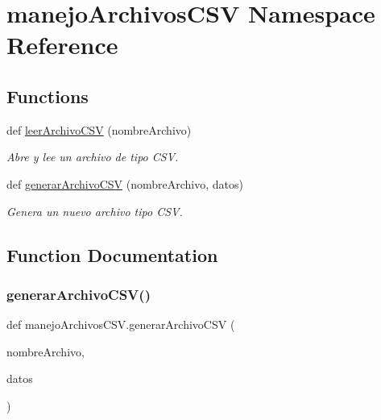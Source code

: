 \hypertarget{namespacemanejo_archivos_c_s_v}{}\section{manejo\+Archivos\+C\+SV Namespace Reference}
\label{namespacemanejo_archivos_c_s_v}
\subsection*{Functions}
\begin{DoxyCompactItemize}
\item 
def \mbox{\hyperlink{namespacemanejo_archivos_c_s_v_af84ef6e5a0591162a0b781c11145845e}{leer\+Archivo\+C\+SV}} (nombre\+Archivo)
\begin{DoxyCompactList}\small\item\em Abre y lee un archivo de tipo C\+SV. \end{DoxyCompactList}\item 
def \mbox{\hyperlink{namespacemanejo_archivos_c_s_v_a0c9d188d26bb6dea35ce440f32015b01}{generar\+Archivo\+C\+SV}} (nombre\+Archivo, datos)
\begin{DoxyCompactList}\small\item\em Genera un nuevo archivo tipo C\+SV. \end{DoxyCompactList}\end{DoxyCompactItemize}


\subsection{Function Documentation}
\mbox{\label{namespacemanejo_archivos_c_s_v_a0c9d188d26bb6dea35ce440f32015b01}} 
\subsubsection{\texorpdfstring{generar\+Archivo\+C\+S\+V()}{generarArchivoCSV()}}
{\footnotesize\ttfamily def manejo\+Archivos\+C\+S\+V.\+generar\+Archivo\+C\+SV (\begin{DoxyParamCaption}\item[{}]{nombre\+Archivo,  }\item[{}]{datos }\end{DoxyParamCaption})}



